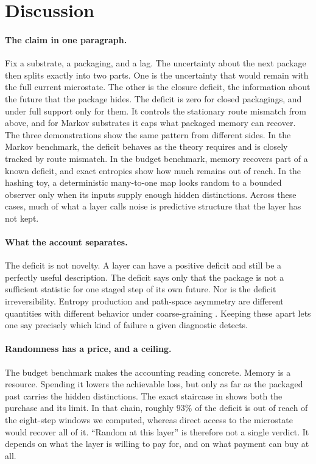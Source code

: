 \section{Discussion}\label{sec:discussion}

\paragraph{The claim in one paragraph.} Fix a substrate, a packaging, and a lag. The uncertainty about the next package then splits exactly into two parts. One is the uncertainty that would remain with the full current microstate. The other is the closure deficit, the information about the future that the package hides. The deficit is zero for closed packagings, and under full support only for them. It controls the stationary route mismatch from above, and for Markov substrates it caps what packaged memory can recover. The three demonstrations show the same pattern from different sides. In the Markov benchmark, the deficit behaves as the theory requires and is closely tracked by route mismatch. In the budget benchmark, memory recovers part of a known deficit, and exact entropies show how much remains out of reach. In the hashing toy, a deterministic many-to-one map looks random to a bounded observer only when its inputs supply enough hidden distinctions. Across these cases, much of what a layer calls noise is predictive structure that the layer has not kept.

\paragraph{What the account separates.} The deficit is not novelty. A layer can have a positive deficit and still be a perfectly useful description. The deficit says only that the package is not a sufficient statistic for one staged step of its own future. Nor is the deficit irreversibility. Entropy production and path-space asymmetry are different quantities with different behavior under coarse-graining \citep{esposito2012stochasticthermodynamicsundercoarsegraining,tsiokos2026sixbirds}. Keeping these apart lets one say precisely which kind of failure a given diagnostic detects.

\paragraph{Randomness has a price, and a ceiling.} The budget benchmark makes the accounting reading concrete. Memory is a resource. Spending it lowers the achievable loss, but only as far as the packaged past carries the hidden distinctions. The exact staircase in  shows both the purchase and its limit. In that chain, roughly $93\%$ of the deficit is out of reach of the eight-step windows we computed, whereas direct access to the microstate would recover all of it. ``Random at this layer'' is therefore not a single verdict. It depends on what the layer is willing to pay for, and on what payment can buy at all.

